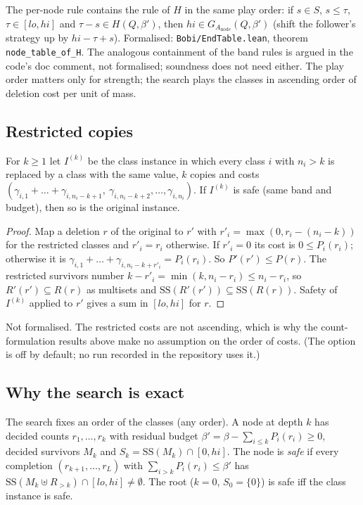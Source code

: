 \begin{remark}[Strength]
The per-node rule contains the rule of $H$ in the same play order: if $s\in S$,
$s\le\tau$, $\tau\in[lo,hi]$ and $\tau-s\in H(Q,\beta')$, then
$hi\in G_{A_{\mathrm{node}}}(Q,\beta')$ (shift the follower's strategy up by
$hi-\tau+s$). Formalised: \texttt{Bobi/EndTable.lean}, theorem
\texttt{node\_table\_of\_H}. The analogous containment of the band rules is
argued in the code's doc comment, not formalised; soundness does not need
either. The play order matters only for strength; the search plays the
classes in ascending order of deletion cost per unit of mass.
\end{remark}

\subsection{Restricted copies}

\begin{proposition}\label{prop:restrict}
For $k\ge 1$ let $I^{(k)}$ be the class instance in which every class $i$ with
$n_i>k$ is replaced by a class with the same value, $k$ copies and costs
$(\gamma_{i,1}+\dots+\gamma_{i,n_i-k+1},\ \gamma_{i,n_i-k+2},\dots,\gamma_{i,n_i})$. If
$I^{(k)}$ is safe (same band and budget), then so is the original instance.
\end{proposition}
\begin{proof}
Map a deletion $r$ of the original to $r'$ with
$r'_i=\max(0,r_i-(n_i-k))$ for the restricted classes and $r'_i=r_i$ otherwise.
If $r'_i=0$ its cost is $0\le P_i(r_i)$; otherwise it is
$\gamma_{i,1}+\dots+\gamma_{i,n_i-k+r'_i}=P_i(r_i)$. So $P'(r')\le P(r)$. The
restricted survivors number $k-r'_i=\min(k,n_i-r_i)\le n_i-r_i$, so
$R'(r')\subseteq R(r)$ as multisets and $\mathrm{SS}(R'(r'))\subseteq\mathrm{SS}(R(r))$. Safety
of $I^{(k)}$ applied to $r'$ gives a sum in $[lo,hi]$ for $r$.
\end{proof}
\noindent Not formalised. The restricted costs are not ascending, which is
why the count-formulation results above make no assumption on the order of
costs. (The option is off by default; no run recorded in the repository
uses it.)

\subsection{Why the search is exact}\label{app:kip-exact}

The search fixes an order of the classes (any order). A node at depth $k$ has
decided counts $r_1,\dots,r_k$ with residual budget $\beta'=\beta-\sum_{i\le k}P_i(r_i)\ge 0$,
decided survivors $M_k$ and $S_k=\mathrm{SS}(M_k)\cap[0,hi]$. The node is \emph{safe}
if every completion $(r_{k+1},\dots,r_L)$ with $\sum_{i>k}P_i(r_i)\le\beta'$ has
$\mathrm{SS}(M_k\uplus R_{>k})\cap[lo,hi]\neq\emptyset$. The root ($k=0$, $S_0=\{0\}$) is safe
iff the class instance is safe.

